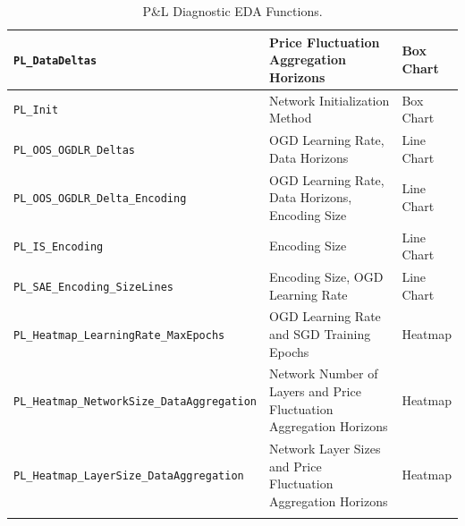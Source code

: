 \documentclass[a4paper,11pt,oneside]{article}
\theoremstyle{plain}
\theoremstyle{definition}
\begin{document}
\begin{longtable}{|p{0.5\linewidth}|p{0.4\linewidth}|p{0.1\linewidth}|}
		\texttt{PL\_DataDeltas} & {Price Fluctuation Aggregation Horizons}& {Box Chart} \\\hline
		\texttt{PL\_Init}& {Network Initialization Method} & {Box Chart} \\\hline		
		\texttt{PL\_OOS\_OGDLR\_Deltas}& {OGD Learning Rate, Data Horizons} & {Line Chart} \\\hline		
		\texttt{PL\_OOS\_OGDLR\_Delta\_Encoding}& {OGD Learning Rate, Data Horizons, Encoding Size} & {Line Chart} \\\hline		
		\texttt{PL\_IS\_Encoding}& {Encoding Size} & {Line Chart} \\\hline	
		\texttt{PL\_SAE\_Encoding\_SizeLines}& {Encoding Size, OGD Learning Rate} & {Line Chart} \\\hline	
		\texttt{PL\_Heatmap\_LearningRate\_MaxEpochs} & {OGD Learning Rate and SGD Training Epochs}& {Heatmap} \\\hline
		\texttt{PL\_Heatmap\_NetworkSize\_DataAggregation} & {Network Number of Layers and Price Fluctuation Aggregation Horizons}& {Heatmap} \\\hline
		\texttt{PL\_Heatmap\_LayerSize\_DataAggregation}& {Network Layer Sizes and Price Fluctuation Aggregation Horizons } & {Heatmap} \\\hline
		
		\caption{P\&L Diagnostic EDA Functions.}
		\label{tab_diagnostics_pl}
	\end{longtable}
\end{document}

